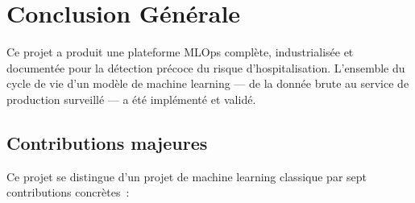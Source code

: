 \chapter*{Conclusion Générale}

\begin{resultatbox}
Ce projet a produit une plateforme MLOps complète, industrialisée et documentée
pour la détection précoce du risque d'hospitalisation. L'ensemble du cycle de
vie d'un modèle de machine learning --- de la donnée brute au service de
production surveillé --- a été implémenté et validé.
\end{resultatbox}

\vspace{1em}

\section*{Contributions majeures}

Ce projet se distingue d'un projet de machine learning classique par sept
contributions concrètes~:

